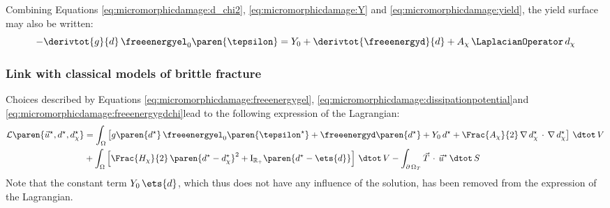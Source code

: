 Combining Equations \eqref{eq:micromorphicdamage:d_chi2},
\eqref{eq:micromorphicdamage:Y} and \eqref{eq:micromorphicdamage:yield}, the yield
surface may also be written:
%
%
%
\begin{equation}
  \label{eq:micromorphicdamage:damage_estimate}
  -\derivtot{g}{d}\,\freeenergyel_{0}\paren{\tepsilon}=
  Y_{0}+\derivtot{\freeenergyd}{d}+A_{\chi}\,\LaplacianOperator\,d_{\chi}
\end{equation}

\subsubsection{Link with classical models of brittle fracture}

Choices described by Equations \eqref{eq:micromorphicdamage:freeenergygel},
\eqref{eq:micromorphicdamage:dissipationpotential}and
\eqref{eq:micromorphicdamage:freeenergygdchi}lead to the following expression
of the Lagrangian:
%
%
%
\begin{equation}
  \label{eq:micromorphicdamage:Lagrangian}
  \begin{aligned}
  \mathcal{L}\paren{\vec{u}^{\star},d^{\star},d_{\chi}^{\star}}
  &=\int_{\Omega}
  \left[
  g\paren{d^{\star}}\,\freeenergyel_{0}\paren{\tepsilon^{\star}}+
  \freeenergyd\paren{d^{\star}}+
  Y_{0}\,d^{\star}
  +\Frac{A_{\chi}}{2}\,\nabla\, d_{\chi}^{\star}\,\cdot\,\nabla\, d_{\chi}^{\star}
  \right]
  \,\dtot\,V\\
  &+\int_{\Omega}
  \left[
  \Frac{H_{\chi}}{2}\,\paren{d^{\star}-d_{\chi}^{\star}}^{2}+
  \mathrm{I}_{\mathbb{R}_{+}}\paren{d^{\star}-\ets{d}} 
  \right]
  \,\dtot\,V
  - \int_{\partial\,\Omega_{T}} \vec{T}\,\cdot\,\vec{u}^{\star} \,\dtot\,S
  \end{aligned}
\end{equation}
Note that the constant term $Y_{0}\,\ets{d}$, which thus does not have
any influence of the solution, has been removed from the expression of
the Lagrangian.

